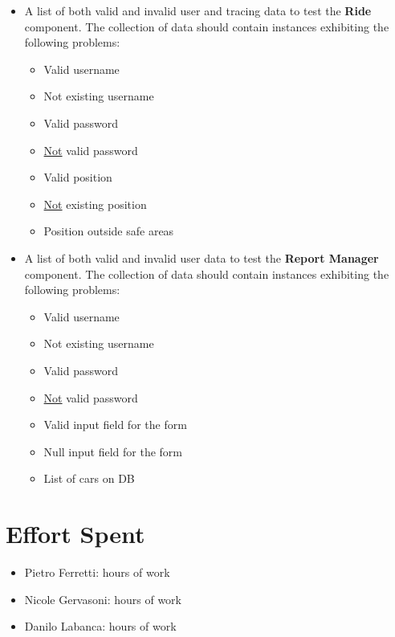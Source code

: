 \documentclass[english]{article}
\begin{document}
\begin{itemize}
    \item{A list of both valid and invalid user and tracing data to test the \textbf{Ride} component.
    The collection of data should contain instances exhibiting the following problems:
    \begin{itemize}
      \item{Valid username}
      \item{Not existing username}
      \item{Valid password}
      \item{\underline{Not} valid password}
      \item{Valid position}
      \item{\underline{Not} existing position}
      \item{Position outside safe areas}
    \end{itemize}}

    \item{A list of both valid and invalid user data to test the \textbf{Report Manager} component.
    The collection of data should contain instances exhibiting the following problems:
    \begin{itemize}
      \item{Valid username}
      \item{Not existing username}
      \item{Valid password}
      \item{\underline{Not} valid password}
      \item{Valid input field for the form}
      \item{Null input field for the form}
      \item{List of cars on DB}
    \end{itemize}}

\end{itemize}

\section{Effort Spent}
\begin{itemize}
	\item{Pietro Ferretti:  hours of work}
	\item{Nicole Gervasoni:  hours of work}
	\item{Danilo Labanca:  hours of work}
\end{itemize}
\end{document}
